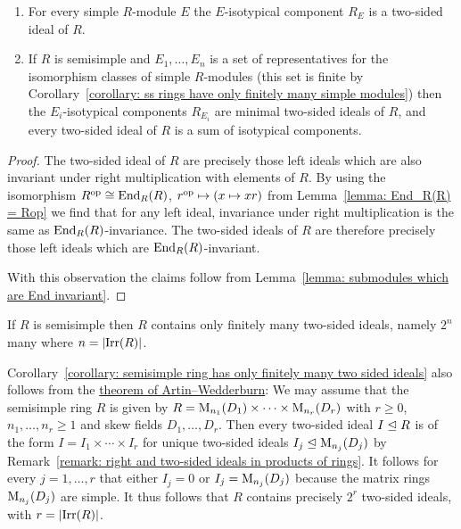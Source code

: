 \begin{corollary}
  \label{corollary: isotypical components as two sided ideals}
  \leavevmode
  \begin{enumerate}
    \item
      For every simple $R$-module $E$ the $E$-isotypical component $R_E$ is a two-sided ideal of $R$.
    \item
      If $R$ is semisimple and $E_1, \dotsc, E_n$ is a set of representatives for the isomorphism classes of simple $R$-modules (this set is finite by Corollary~\ref{corollary: ss rings have only finitely many simple modules}) then the $E_i$-isotypical components $R_{E_i}$ are minimal two-sided ideals of $R$, and every two-sided ideal of $R$ is a sum of isotypical components.
  \end{enumerate}
\end{corollary}


\begin{proof}
    The two-sided ideal of $R$ are precisely those left ideals which are also invariant under right multiplication with elements of $R$.
    By using the isomorphism $R^{\operatorname{op}} \cong \operatorname{End}_R(R)$, $r^{\operatorname{op}} \mapsto (x \mapsto xr)$ from Lemma~\ref{lemma: End_R(R) = Rop} we find that for any left ideal, invariance under right multiplication is the same as $\operatorname{End}_R(R)$-invariance.
    The two-sided ideals of $R$ are therefore precisely those left ideals which are $\operatorname{End}_R(R)$-invariant.
    
    With this observation the claims follow from Lemma~\ref{lemma: submodules which are End invariant}.
\end{proof}


\begin{corollary}
  \label{corollary: semisimple ring has only finitely many two sided ideals}
  If $R$ is semisimple then $R$ contains only finitely many two-sided ideals, namely $2^n$ many where $n = |{\operatorname{Irr}(R)}|$.
\end{corollary}




\begin{remark}
  Corollary~\ref{corollary: semisimple ring has only finitely many two sided ideals} also follows from the \hyperref[theorem: artin wedderburn theorem]{theorem of Artin--Wedderburn}:
  We may assume that the semisimple ring $R$ is given by $R = \operatorname{M}_{n_1}(D_1) \times \dotsb \times \operatorname{M}_{n_r}(D_r)$ with $r \geq 0$, $n_1, \dotsc, n_r \geq 1$ and skew fields $D_1, \dotsc, D_r$.
  Then every two-sided ideal $I \trianglelefteq R$ is of the form $I = I_1 \times \dotsb \times I_r$ for unique two-sided ideals $I_j \trianglelefteq \operatorname{M}_{n_j}(D_j)$ by Remark~\ref{remark: right and two-sided ideals in products of rings}.
  It follows for every $j = 1, \dotsc, r$ that either $I_j = 0$ or $I_j = \operatorname{M}_{n_j}(D_j)$ because the matrix rings $\operatorname{M}_{n_j}(D_j)$ are simple.
  It thus follows that $R$ contains precisely $2^r$ two-sided ideals, with $r = |{\operatorname{Irr}(R)}|$.
\end{remark}


